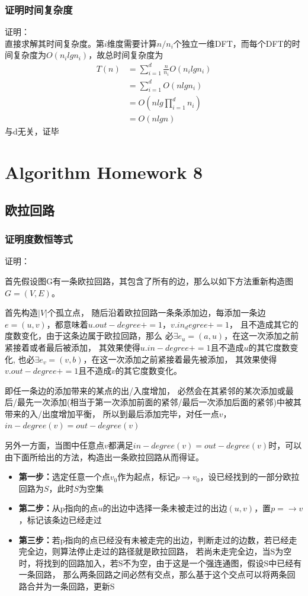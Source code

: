 \documentclass[cn,11pt,chinese]{elegantbook}
\begin{document}
\subsection{证明时间复杂度}
证明： \\
直接求解其时间复杂度。第$i$维度需要计算$n/n_i$个独立一维DFT，而每个DFT的时间复杂度为$O(n_ilgn_i)$，故总时间复杂度为
\begin{equation}
	\begin{aligned}
		T(n) &= \sum_{i=1}^d \frac{n}{n_i}O(n_ilgn_i) \\
			&= \sum_{i=1}^d O(nlgn_i) \\
			&= O(nlg\prod_{i=1}^d n_i) \\
			&= O(nlgn)
	\end{aligned}
	\nonumber
\end{equation}
与d无关，证毕

\chapter{Algorithm Homework 8}

\section{欧拉回路}

\subsection{证明度数恒等式}
证明：

首先假设图G有一条欧拉回路，其包含了所有的边，那么以如下方法重新构造图$G=(V,E)$。

首先构造$|V|$个孤立点，
随后沿着欧拉回路一条条添加边，每添加一条边$e=(u,v)$，都意味着$u.out-degree+=1$，$v.in_degree+=1$，
且不造成其它的度数变化，由于这条边属于欧拉回路，那么
必$\exists e_u = (a,u)$，在这一次添加之前紧接着或者最后被添加，
其效果使得$u.in-degree+=1$且不造成$u$的其它度数变化,
也必$\exists e_v = (v,b)$，在这一次添加之前紧接着最先被添加，
其效果使得$v.out-degree+=1$且不造成$v$的其它度数变化。

即任一条边的添加带来的某点的出/入度增加，
必然会在其紧邻的某次添加或最后/最先一次添加(相当于第一次添加前面的紧邻/最后一次添加后面的紧邻)中被其带来的入/出度增加平衡，
所以到最后添加完毕，对任一点$v$，$in-degree(v) = out-degree(v)$

另外一方面，当图中任意点$v$都满足$in-degree(v) = out-degree(v)$时，可以由下面所给出的方法，构造出一条欧拉回路从而得证。
\begin{itemize}
	\item \textbf{第一步：}选定任意一个点$v_0$作为起点，标记$p\rightarrow v_0$，设已经找到的一部分欧拉回路为$S$，此时$S$为空集
	\item \textbf{第二步：}从p指向的点$u$的出边中选择一条未被走过的出边$(u,v)$，置$p = \rightarrow v$，标记该条边已经走过
	\item \textbf{第三步：}若p指向的点已经没有未被走完的出边，判断走过的边数，若已经走完全边，则算法停止走过的路径就是欧拉回路，
							若尚未走完全边，当S为空时，将找到的回路加入，若S不为空，由于这是一个强连通图，假设S中已经有一条回路，
							那么两条回路之间必然有交点，那么基于这个交点可以将两条回路合并为一条回路，更新S
\end{itemize}
\end{document}
